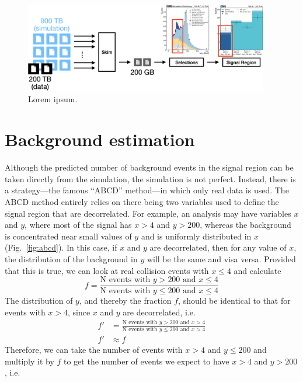 \begin{figure}[htb]
    \centering
    \includegraphics[width=0.95\textwidth]{fig/cms/nano_to_SR.png}
    \caption{
        Lorem ipsum.
    }
    \label{fig:nano_to_SR}
\end{figure}

\section{Background estimation}
Although the predicted number of background events in the signal region can be taken directly from the simulation, the simulation is not perfect. 
Instead, there is a strategy---the famous ``ABCD'' method---in which only real data is used. 
The ABCD method entirely relies on there being two variables used to define the signal region that are decorrelated. 
For example, an analysis may have variables $x$ and $y$, where most of the signal has $x > 4$ and $y > 200$, whereas the background is concentrated near small values of $y$ and is uniformly distributed in $x$ (Fig.~\ref{fig:abcd}). 
In this case, if $x$ and $y$ are decorrelated, then for any value of $x$, the distribution of the background in $y$ will be the same and visa versa. 
Provided that this is true, we can look at real collision events with $x \leq 4$ and calculate
\begin{equation}
    f = \frac{\text{N events with }y > 200\text{ and }x \leq 4}{\text{N events with }y \leq 200\text{ and }x \leq 4}
\end{equation}
The distribution of $y$, and thereby the fraction $f$, should be identical to that for events with $x > 4$, since $x$ and $y$ are decorrelated, i.e. 
\begin{align}
    f' &= \frac{\text{N events with }y > 200\text{ and }x > 4}{\text{N events with }y \leq 200\text{ and }x > 4} \\
    f' &\approx f
\end{align}
Therefore, we can take the number of events with $x > 4$ and $y \leq 200$ and multiply it by $f$ to get the number of events we expect to have $x > 4$ and $y > 200$, i.e. 
